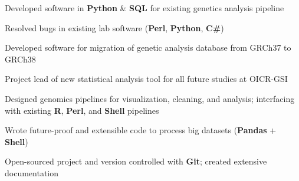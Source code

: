 \documentclass[]{chandan-cv}
\begin{document}
\begin{minipage}[t]{0.75\textwidth}
\begin{tightemize}
	\item Developed software in \textbf{Python} \& \textbf{SQL} for existing genetics analysis pipeline 
	\item Resolved bugs in existing lab software (\textbf{Perl}, \textbf{Python}, \textbf{C\#})
	\item Developed software for migration of genetic analysis database from GRCh37 to GRCh38
\end{tightemize}
\sectionsep


\end{minipage}

\newpage

\begin{minipage}[t]{0.77\textwidth}
\begin{tightemize}
	\item Project lead of new statistical analysis tool for all future studies at OICR-GSI
	\item Designed genomics pipelines for visualization, cleaning, and analysis; 
	interfacing with existing \textbf{R}, \textbf{Perl}, and \textbf{Shell} pipelines
	\item Wrote future-proof and extensible code to process big datasets (\textbf{Pandas} + \textbf{Shell})
	\item Open-sourced project and version controlled with \textbf{Git}; created extensive documentation
\end{tightemize}
\sectionsep



\end{minipage}
\end{document}
